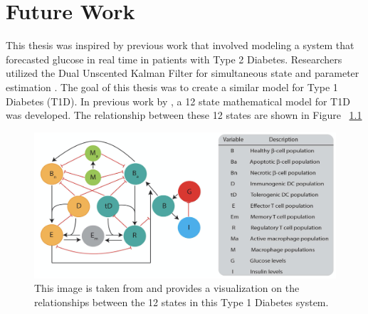 \chapter{Future Work}
\label{Future Work}


This thesis was inspired by previous work that involved modeling a system that forecasted glucose in real time in patients with Type 2 Diabetes. Researchers utilized the Dual Unscented Kalman Filter for simultaneous state and parameter estimation \cite{article1}. The goal of this thesis was to create a similar model for Type 1 Diabetes (T1D). In previous work by \cite{Shtylla}, a 12 state mathematical model for T1D was developed. The relationship between these 12 states are shown in Figure ~\ref{fig:relations}

\begin{figure}[h]
    \centering
    \includegraphics[scale = 0.5]{t1d_model.png}
    \caption{This image is taken from \cite{Shtylla} and provides a visualization on the relationships between the 12 states in this Type 1 Diabetes system.}
    \label{fig:relations}
\end{figure}

